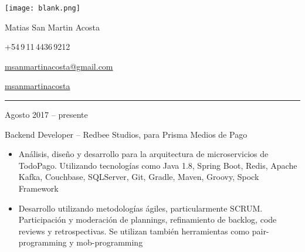 \documentclass[a4paper,10pt]{article}
\newlength{\cvcolumngapwidth}
\newlength{\cvleftcolumnwidth}
\newlength{\cvrightcolumnwidth}
\newcommand{\cvnamestyle}[1]{{\Large\cvnamefont\textcolor{cvnamecolor}{#1}}}
\newcommand{\cvsectionstyle}[1]{{\normalsize\cvsectionfont\textcolor{cvsectioncolor}{#1}}}
\newcommand{\cvtitlestyle}[1]{{\large\cvtitlefont\textcolor{cvtitlecolor}{#1}}}
\newcommand{\cvdurationstyle}[1]{{\small\cvdurationfont\textcolor{cvdurationcolor}{#1}}}
\newlength{\cvafteritemskipamount}
\newlength{\cvaftersectionskipamount}
\newlength{\cvafternameskipamount}
\newlength{\cvafterpersonalinfolineskipamount}
\newlength{\cvaftertitleskipamount}
\newlength{\cvparskip}
\newcommand{\cvpersonalinfo}[2]{
    \begin{minipage}[t]{\cvleftcolumnwidth}
       \vspace{0mm} %
       \raggedleft #1
    \end{minipage}%
    \hspace{\cvcolumngapwidth}%
    \begin{minipage}[t]{\cvrightcolumnwidth}
        \vspace{0mm} %
        #2
    \end{minipage}

    \vspace{\cvafteritemskipamount}
}
\newcommand{\cvname}[1]{
    \cvnamestyle{#1}

    \vspace{\cvafternameskipamount}
}
\newcommand{\cvpersonalinfolinewithicon}[3]{
    #3
    \raisebox{.5\fontcharht\font`E-.5\height}{\texttt{[image: \#2]}}
    

    \vspace{\cvafterpersonalinfolineskipamount}
}
\newcommand{\cvsection}[1]{
    \begin{minipage}[t]{\cvleftcolumnwidth}
        \raggedleft\cvsectionstyle{#1}
    \end{minipage}%
    \hspace{\cvcolumngapwidth}%
    \begin{minipage}[t]{\cvrightcolumnwidth}
        \textcolor{cvrulecolor}{\rule{\cvrightcolumnwidth}{0.6mm}}
    \end{minipage}

    \vspace{\cvaftersectionskipamount}
}
\newcommand{\cvitem}[2]{
    \begin{minipage}[t]{\cvleftcolumnwidth}
        \raggedleft #1
    \end{minipage}%
    \hspace{\cvcolumngapwidth}%
    \begin{minipage}[t]{\cvrightcolumnwidth}
        \setlength{\parskip}{\cvparskip} #2
    \end{minipage}

    \vspace{\cvafteritemskipamount}
}
\newcommand{\cvtitle}[1]{
    \cvtitlestyle{#1}

    \vspace{\cvaftertitleskipamount}
    \vspace{-\cvparskip}
}
\newcommand{\emptyline}{\vspace{1mm}}
\begin{document}

\cvpersonalinfo{
    \texttt{[image: blank.png]}
}{
    \cvname{\hspace*{\fill}Matias San Martin Acosta}


    \hspace*{\fill}\cvpersonalinfolinewithicon{height=4mm}{067-phone.pdf}{
    +54\,9\,11\,4436\,9212
    }

    \hspace*{\fill}\cvpersonalinfolinewithicon{height=4mm}{070-envelop.pdf}{
        \href{mailto:msanmartinacosta@gmail.com}{msanmartinacosta@gmail.com}
    }

    \hspace*{\fill}\cvpersonalinfolinewithicon{height=4mm}{458-linkedin.pdf}{
       \href{https://www.linkedin.com/in/msanmartinacosta}{msanmartinacosta}
    }

}



\cvsection{EXPERIENCIA LABORAL}

\cvitem{
    \cvdurationstyle{Agosto 2017 -- presente}
}{
    \cvtitle{Backend Developer -- \normalsize Redbee Studios, para Prisma Medios de Pago} \emptyline

    \begin{itemize}[leftmargin=*]
    
        \item Análisis, diseño y desarrollo para la arquitectura de microservicios de TodoPago. Utilizando tecnologías como Java 1.8, Spring Boot, Redis, Apache Kafka, Couchbase, SQLServer, Git, Gradle, Maven, Groovy, Spock Framework \emptyline
        
        \item Desarrollo utilizando metodologías ágiles, particularmente SCRUM. Participación y moderación de plannings, refinamiento de backlog, code reviews y retrospectivas. Se utilizan también herramientas como pair-programming y mob-programming \emptyline
        
    \end{itemize}
}
\end{document}
